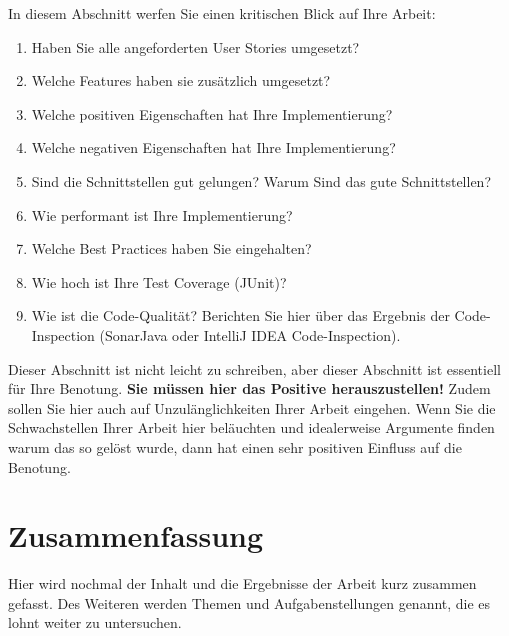 \documentclass[fleqn,10pt,ngerman]{SelfArx}
\begin{document}
	In diesem Abschnitt werfen Sie einen kritischen Blick auf Ihre Arbeit:
	\begin{enumerate}
		\item Haben Sie alle angeforderten User Stories umgesetzt? 
		\item Welche Features haben sie zus\"atzlich umgesetzt?
		\item Welche positiven Eigenschaften hat Ihre Implementierung?
		\item Welche negativen Eigenschaften hat Ihre Implementierung? 		
		\item Sind die Schnittstellen gut gelungen? Warum Sind das gute Schnittstellen? 
		\item Wie performant ist Ihre Implementierung?
		\item Welche Best Practices haben Sie eingehalten? 
		\item Wie hoch ist Ihre Test Coverage (JUnit)? 
		\item Wie ist die Code-Qualität? Berichten Sie hier über das Ergebnis der Code-Inspection (SonarJava oder IntelliJ IDEA Code-Inspection). 
	\end{enumerate}
	
	Dieser Abschnitt ist nicht leicht zu schreiben, aber dieser Abschnitt ist essentiell für Ihre Benotung. \textbf{Sie müssen hier das Positive herauszustellen!} Zudem sollen Sie hier auch auf Unzul\"anglichkeiten Ihrer Arbeit eingehen. Wenn Sie die Schwachstellen Ihrer Arbeit hier bel\"auchten und idealerweise Argumente finden warum das so gelöst wurde, dann hat einen sehr positiven Einfluss auf die Benotung. 

	
	
	\section{Zusammenfassung}
	Hier wird nochmal der Inhalt und die Ergebnisse der Arbeit kurz zusammen gefasst. Des Weiteren werden Themen und Aufgabenstellungen genannt, die es lohnt weiter zu untersuchen.
	
	
	
	
	
	
\end{document}
